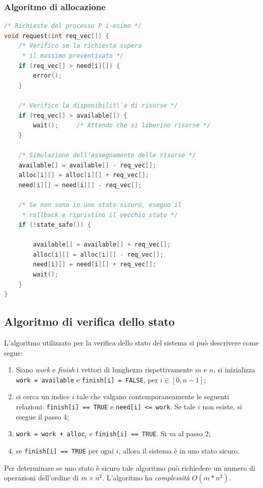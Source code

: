 \documentclass[a4paper,12pt, twoside]{report}
\begin{document}
\subsubsection{Algoritmo di allocazione}

\begin{lstlisting}[language=C]
/* Richieste del processo P i-esimo */
void request(int req_vec[]) { 
	/* Verifico se la richiesta supera 
	 * il massimo preventivato */
	if (req_vec[] > need[i][]) {  
		error();
	}
	
	/* Verifico la disponibilit\`a di risorse */
	if (req_vec[] > available[]) {
		wait();		/* Attendo che si liberino risorse */
	}
	
	/* Simulazione dell'assegnamento delle risorse */
	available[] = available[] - req_vec[];
	alloc[i][] = alloc[i][] + req_vec[];
	need[i][] = need[i][] - req_vec[];

	/* Se non sono in uno stato sicuro, eseguo il  
	 * rollback e ripristino il vecchio stato */
	if (!state_safe()) { 	
		
		available[] = available[] + req_vec[];
		alloc[i][] = alloc[i][] - req_vec[];
		need[i][] = need[i][] + req_vec[];
		wait();
	}
}	
\end{lstlisting}

\subsection{Algoritmo di verifica dello stato}

L'algoritmo utilizzato per la verifica dello stato del sistema si pu\`o descrivere come segue:
\begin{enumerate}
\item Siano \emph{work} e \emph{finish} i vettori di lunghezza rispettivamente $m$ e $n$, si inizializza \texttt{work = available} e \texttt{finish[i] = FALSE}, per $i \in  [0, n-1]$;
\item si cerca un indice $i$ tale che valgano contemporaneamente le seguenti relazioni: \texttt{finish[i] == TRUE} e \texttt{need[i] <= work}. Se tale $i$ non esiste, si esegue il passo 4;
\item \texttt{work = work + alloc$_i$} e \texttt{finish[i] == TRUE}. Si va al passo 2;
\item se \texttt{finish[i] == TRUE} per ogni $i$, allora il sistema \`e in uno stato sicuro.
\end{enumerate}
Per determinare se uno stato \`e sicuro tale algoritmo pu\`o richiedere un numero di operazioni dell'ordine di $m \times n^2$. L'algoritmo ha \emph{complessit\`a} $O(m*n^2)$.
\end{document}
